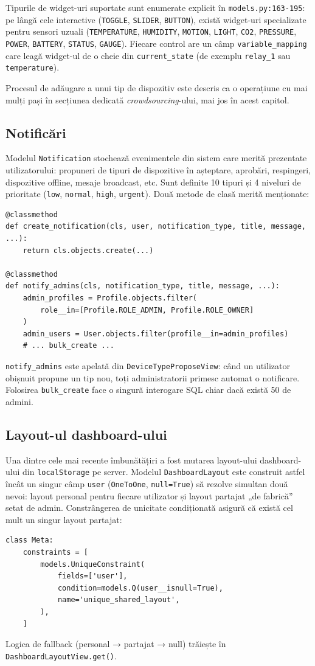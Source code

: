 Tipurile de widget-uri suportate sunt enumerate explicit în \texttt{models.py:163-195}: pe lângă cele interactive (\texttt{TOGGLE}, \texttt{SLIDER}, \texttt{BUTTON}), există widget-uri specializate pentru sensori uzuali (\texttt{TEMPERATURE}, \texttt{HUMIDITY}, \texttt{MOTION}, \texttt{LIGHT}, \texttt{CO2}, \texttt{PRESSURE}, \texttt{POWER}, \texttt{BATTERY}, \texttt{STATUS}, \texttt{GAUGE}). Fiecare control are un câmp \texttt{variable\_mapping} care leagă widget-ul de o cheie din \texttt{current\_state} (de exemplu \texttt{relay\_1} sau \texttt{temperature}).

Procesul de adăugare a unui tip de dispozitiv este descris ca o operațiune cu mai mulți pași în secțiunea dedicată \textit{crowdsourcing}-ului, mai jos în acest capitol.

\subsection{Notificări}
Modelul \texttt{Notification} stochează evenimentele din sistem care merită prezentate utilizatorului: propuneri de tipuri de dispozitive în așteptare, aprobări, respingeri, dispozitive offline, mesaje broadcast, etc. Sunt definite 10 tipuri și 4 niveluri de prioritate (\texttt{low}, \texttt{normal}, \texttt{high}, \texttt{urgent}). Două metode de clasă merită menționate:
\begin{verbatim}
@classmethod
def create_notification(cls, user, notification_type, title, message, ...):
    return cls.objects.create(...)

@classmethod
def notify_admins(cls, notification_type, title, message, ...):
    admin_profiles = Profile.objects.filter(
        role__in=[Profile.ROLE_ADMIN, Profile.ROLE_OWNER]
    )
    admin_users = User.objects.filter(profile__in=admin_profiles)
    # ... bulk_create ...
\end{verbatim}
\texttt{notify\_admins} este apelată din \texttt{DeviceTypeProposeView}: când un utilizator obișnuit propune un tip nou, toți administratorii primesc automat o notificare. Folosirea \texttt{bulk\_create} face o singură interogare SQL chiar dacă există 50 de admini.

\subsection{Layout-ul dashboard-ului}
Una dintre cele mai recente îmbunătățiri a fost mutarea layout-ului dashboard-ului din \texttt{localStorage} pe server. Modelul \texttt{DashboardLayout} este construit astfel încât un singur câmp \texttt{user} (\texttt{OneToOne}, \texttt{null=True}) să rezolve simultan două nevoi: layout personal pentru fiecare utilizator și layout partajat „de fabrică” setat de admin. Constrângerea de unicitate condiționată asigură că există cel mult un singur layout partajat:
\begin{verbatim}
class Meta:
    constraints = [
        models.UniqueConstraint(
            fields=['user'],
            condition=models.Q(user__isnull=True),
            name='unique_shared_layout',
        ),
    ]
\end{verbatim}
Logica de fallback (personal → partajat → null) trăiește în \texttt{DashboardLayoutView.get()}.

